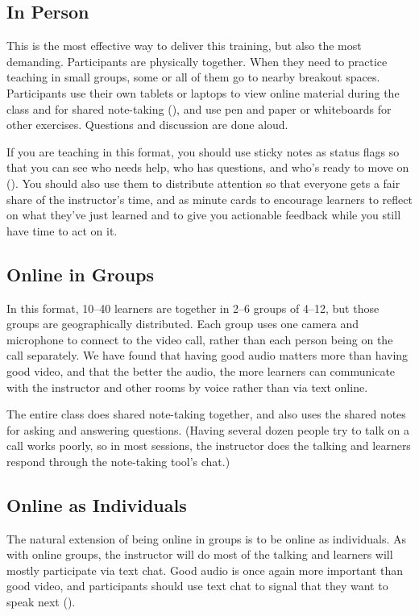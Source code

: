 \subsection*{In Person}

This is the most effective way to deliver this training,
but also the most demanding.
Participants are physically together. When they need to
practice teaching in small groups, some or all of them go to nearby
breakout spaces. Participants use their own tablets or laptops to view
online material during the class and for shared note-taking
(), and use pen and paper or
whiteboards for other exercises. Questions and discussion are done
aloud.

If you are teaching in this format, you should use sticky notes as
status flags so that you can see who needs help, who has questions,
and who's ready to move on (). You
should also use them to distribute attention so that everyone gets a
fair share of the instructor's time, and as minute cards to encourage
learners to reflect on what they've just learned and to give you
actionable feedback while you still have time to act on it.

\subsection*{Online in Groups}

In this format, 10--40 learners are together in 2--6 groups of 4--12, but
those groups are geographically distributed. Each group uses one camera
and microphone to connect to the video call, rather than each person
being on the call separately. We have found that having good audio
matters more than having good video, and that the better the audio, the
more learners can communicate with the instructor and other rooms by
voice rather than via text online.

The entire class does shared note-taking together, and also uses the
shared notes for asking and answering questions. (Having several dozen
people try to talk on a call works poorly, so in most sessions, the
instructor does the talking and learners respond through the note-taking
tool's chat.)

\subsection*{Online as Individuals}

The natural extension of being online in groups is to be online as
individuals. As with online groups, the instructor will do most of the
talking and learners will mostly participate via text chat. Good audio
is once again more important than good video, and participants should
use text chat to signal that they want to speak next
().

